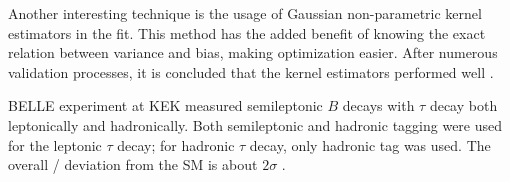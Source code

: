 Another interesting technique is the usage of Gaussian non-parametric kernel
estimators in the fit.
This method has the added benefit of knowing the exact relation between variance
and bias, making optimization easier.
After numerous validation processes, it is concluded that the kernel estimators
performed well \cite{Lees:2013uzd}.

BELLE experiment at KEK measured semileptonic $B$ decays with $\tau$ decay both
leptonically and hadronically.
Both semileptonic and hadronic tagging were used for the leptonic $\tau$ decay;
for hadronic $\tau$ decay, only hadronic tag was used.
The overall \RDDst/ deviation from the SM is about
$2\sigma$ \cite{Hirose:2017185}.
